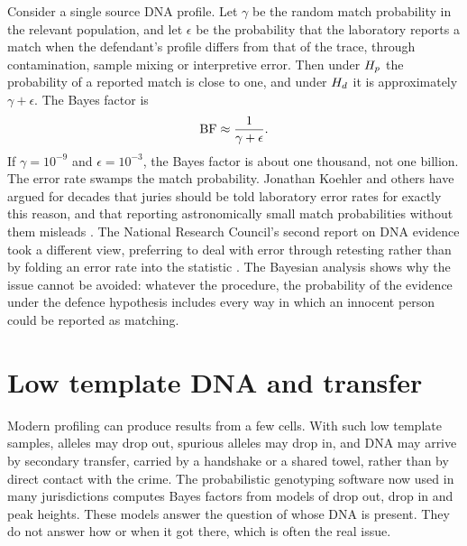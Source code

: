Consider a single source DNA profile. Let $\gamma$ be the random match probability in the relevant population, and let $\epsilon$ be the probability that the laboratory reports a match when the defendant's profile differs from that of the trace, through contamination, sample mixing or interpretive error. Then under $H_{p}$ the probability of a reported match is close to one, and under $H_{d}$ it is approximately $\gamma + \epsilon$. The Bayes factor is
\begin{equation}
\mathrm{BF} \approx \frac{1}{\gamma + \epsilon}.
\label{eq:dnaerror}
\end{equation}
If $\gamma = 10^{-9}$ and $\epsilon = 10^{-3}$, the Bayes factor is about one thousand, not one billion. The error rate swamps the match probability. Jonathan Koehler and others have argued for decades that juries should be told laboratory error rates for exactly this reason, and that reporting astronomically small match probabilities without them misleads \citep{koehler1993,thompson2003}. The National Research Council's second report on DNA evidence took a different view, preferring to deal with error through retesting rather than by folding an error rate into the statistic \citep{nrc1996}. The Bayesian analysis shows why the issue cannot be avoided: whatever the procedure, the probability of the evidence under the defence hypothesis includes every way in which an innocent person could be reported as matching.

\section{Low template DNA and transfer}

Modern profiling can produce results from a few cells. With such low template samples, alleles may drop out, spurious alleles may drop in, and DNA may arrive by secondary transfer, carried by a handshake or a shared towel, rather than by direct contact with the crime. The probabilistic genotyping software now used in many jurisdictions computes Bayes factors from models of drop out, drop in and peak heights. These models answer the question of whose DNA is present. They do not answer how or when it got there, which is often the real issue.

